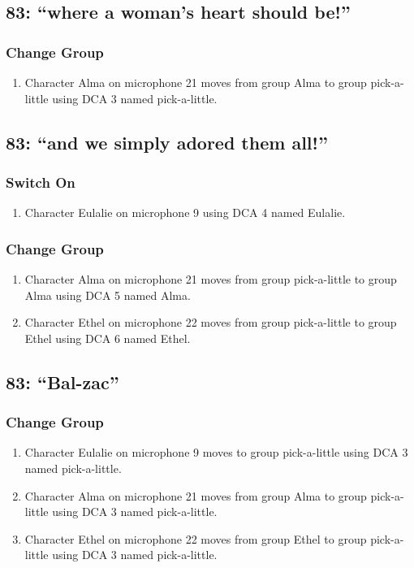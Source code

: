 \subsection* {83: ``where a woman's heart should be!''}
\subsubsection* {Change Group}
\begin{enumerate}
\item Character Alma on microphone 21 moves from group Alma to group pick-a-little using DCA 3 named pick-a-little.
\end{enumerate}
\subsection* {83: ``and we simply adored them all!''}
\subsubsection* {Switch On}
\begin{enumerate}
\item Character Eulalie on microphone 9 using DCA 4 named Eulalie.
\end{enumerate}
\subsubsection* {Change Group}
\begin{enumerate}
\item Character Alma on microphone 21 moves from group pick-a-little to group Alma using DCA 5 named Alma.
\item Character Ethel on microphone 22 moves from group pick-a-little to group Ethel using DCA 6 named Ethel.
\end{enumerate}
\subsection* {83: ``Bal-zac''}
\subsubsection* {Change Group}
\begin{enumerate}
\item Character Eulalie on microphone 9 moves to group pick-a-little using DCA 3 named pick-a-little.
\item Character Alma on microphone 21 moves from group Alma to group pick-a-little using DCA 3 named pick-a-little.
\item Character Ethel on microphone 22 moves from group Ethel to group pick-a-little using DCA 3 named pick-a-little.
\end{enumerate}

